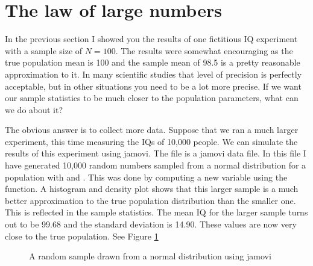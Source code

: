 \section{The law of large numbers~\label{sec:lawlargenumbers}}

In the previous section I showed you the results of one fictitious IQ experiment with a sample size of $N=100$. The results were somewhat encouraging as the true population mean is 100 and the sample mean of 98.5 is a pretty reasonable approximation to it. In many scientific studies that level of precision is perfectly acceptable, but in other situations you need to be a lot more precise. If we want our sample statistics to be much closer to the population parameters, what can we do about it?

The obvious answer is to collect more data. Suppose that we ran a much larger experiment, this time measuring the IQs of 10,000 people. We can simulate the results of this experiment using jamovi. The  file is a jamovi data file. In this file I have generated 10,000 random numbers sampled from a normal distribution for a population with  and . This was done by computing a new variable using the  function. A histogram and density plot shows that this larger sample is a much better approximation to the true population distribution than the smaller one. This is reflected in the sample statistics. The mean IQ for the larger sample turns out to be 99.68 and the standard deviation is 14.90. These values are now very close to the true population. See Figure \ref{fig:iqsim}

\begin{figure}[p]
\begin{center}
\end{center}
\caption{A random sample drawn from a normal distribution using jamovi}
\label{fig:iqsim}
\HR
\end{figure}

